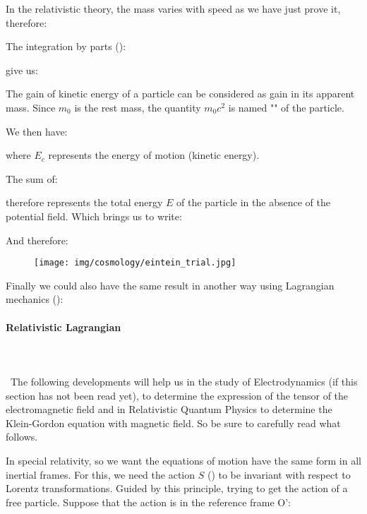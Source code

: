 	In the relativistic theory, the mass varies with speed as we have just prove it, therefore:
	
	The integration by parts ():
	
	give us:
	
	The gain of kinetic energy of a particle can be considered as gain in its apparent mass. Since $m_0$ is the rest mass, the quantity $m_0c^2$ is named "" of the particle.

	We then have:
	
	where $E_c$ represents the energy of motion (kinetic energy).

	The sum of:
	
	therefore represents the total energy $E$ of the particle in the absence of the potential field. Which brings us to write:
	
	And therefore:
	
	\begin{figure}[H]
		\begin{center}
		\texttt{[image: img/cosmology/eintein\_trial.jpg]}
		\end{center}
	\end{figure}
	Finally we could also have the same result in another way using Lagrangian mechanics ():
	
	\paragraph{Relativistic Lagrangian}\label{relativistic lagrangien}\mbox{}\\\\\
	The following developments will help us in the study of Electrodynamics (if this section has not been read yet), to determine the expression of the tensor of the electromagnetic field and in Relativistic Quantum Physics to determine the Klein-Gordon equation with magnetic field. So be sure to carefully read what follows.

	In special relativity, so we want the equations of motion have the same form in all inertial frames. For this, we need the action $S$ () to be invariant with respect to Lorentz transformations. Guided by this principle, trying to get the action of a free particle. Suppose that the action is in the reference frame O':
	

